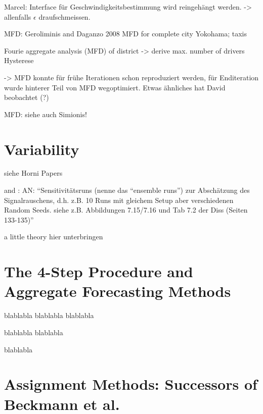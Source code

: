 Marcel: Interface für Geschwindigkeitsbestimmung wird reingehängt werden.
-> allenfalls $\epsilon$ draufschmeissen.

MFD:
Geroliminis and Daganzo 2008
MFD for complete city
Yokohama; taxis

Fourie
aggregate analysis (MFD) of district
-> derive max. number of drivers
Hysterese

-> MFD konnte für frühe Iterationen schon reproduziert werden, für Enditeration wurde hinterer Teil von MFD wegoptimiert. Etwas ähnliches hat David beobachtet (?)

MFD: siehe auch Simionis!

\section{Variability}
\label{sec:variability}

siehe Horni Papers

and \citet[][]{Neumann_PhDThesis_2014}: AN: ``Sensitivitätsruns (nenne das ``ensemble runs'') zur Abschätzung des Signalrauschens, d.h. z.B. 10 Runs mit gleichem Setup aber verschiedenen Random Seeds. siehe z.B. Abbildungen 7.15/7.16 und Tab 7.2 der Diss (Seiten 133-135)''

a little theory hier unterbringen



\section{The 4-Step Procedure and Aggregate Forecasting Methods}
blablabla blablabla blablabla

blablabla blablabla

blablabla

\section{Assignment Methods: Successors of Beckmann et al.}

